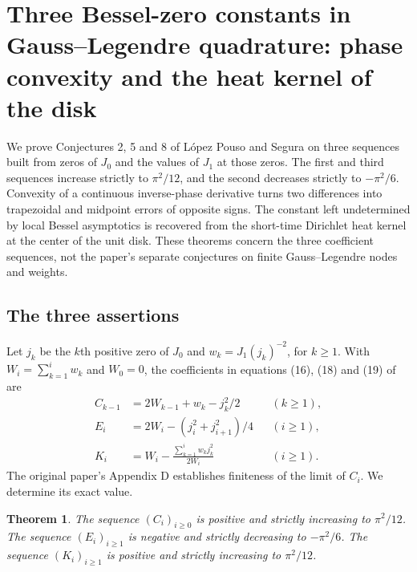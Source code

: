 \documentclass[11pt,a4paper]{article}
\numberwithin{equation}{section}
\newtheorem{theorem}{Theorem}[section]
\theoremstyle{definition}
\theoremstyle{remark}
\newenvironment{sectionabstract}{\par\smallskip\begingroup\small\noindent}{\par\endgroup\medskip}
\begin{document}
\begingroup

\section{\texorpdfstring{Three Bessel-zero constants in Gauss--Legendre quadrature: phase convexity and the heat kernel of the disk}{Three Bessel-zero constants in Gauss--Legendre quadrature: phase convexity and the heat kernel of the disk}}\label{section:r36showa}
\par\medskip

\begin{sectionabstract}
We prove Conjectures 2, 5 and 8 of L\'opez Pouso and Segura on three sequences built from zeros of $J_0$ and the values of $J_1$ at those zeros. The first and third sequences increase strictly to $\pi^2/12$, and the second decreases strictly to $-\pi^2/6$. Convexity of a continuous inverse-phase derivative turns two differences into trapezoidal and midpoint errors of opposite signs. The constant left undetermined by local Bessel asymptotics is recovered from the short-time Dirichlet heat kernel at the center of the unit disk. These theorems concern the three coefficient sequences, not the paper's separate conjectures on finite Gauss--Legendre nodes and weights.
\end{sectionabstract}

\subsection{The three assertions}
Let $j_k$ be the $k$th positive zero of $J_0$ and $w_k=J_1(j_k)^{-2}$, for $k\ge1$. With $W_i=\sum_{k=1}^i w_k$ and $W_0=0$, the coefficients in equations (16), (18) and (19) of \cite{r36showa:lps} are
\[
\begin{aligned}
 C_{k-1}&=2W_{k-1}+w_k-j_k^2/2 &&(k\ge1),\\
 E_i&=2W_i-(j_i^2+j_{i+1}^2)/4 &&(i\ge1),\\
 K_i&=W_i-\frac{\sum_{k=1}^i w_k j_k^2}{2W_i} &&(i\ge1).
\end{aligned}
\]
The original paper's Appendix D establishes finiteness of the limit of $C_i$. We determine its exact value.
\begin{theorem}
The sequence $(C_i)_{i\ge0}$ is positive and strictly increasing to $\pi^2/12$. The sequence $(E_i)_{i\ge1}$ is negative and strictly decreasing to $-\pi^2/6$. The sequence $(K_i)_{i\ge1}$ is positive and strictly increasing to $\pi^2/12$.
\end{theorem}
\end{document}
